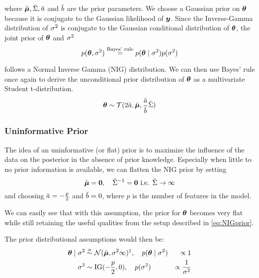 where $\breve{\bm{\mu}}, \breve{\Sigma}, \breve{a}$ and $\breve{b}$ are the prior parameters.
We choose a Gaussian prior on $\bm{\theta}$ because it is conjugate to the Gaussian likelihood of $\bm{y}$.
Since the Inverse-Gamma distribution of $\sigma^2$ is conjugate to the Gaussian conditional distribution of $\bm{\theta}$, the joint prior of $\bm{\theta}$ and $\sigma^2$
\begin{equation*}
    p(\bm{\theta}, \sigma^2) \overset{\text{Bayes' rule}}{=} p(\bm{\theta} \mid \sigma^2) p(\sigma^2)
\end{equation*}

follows a Normal Inverse Gamma (NIG) distribution.
We can then use Bayes' rule once again to derive the unconditional prior distribution of $\bm{\theta}$ as a multivariate Student t-distribution.
\begin{equation*}
    \bm{\theta} \sim \mathcal{T}(2 \breve{a}, \breve{\bm{\mu}}, \frac{\breve{a}}{\breve{b}} \breve{\Sigma})
\end{equation*}

\subsubsection*{Uninformative Prior}
The idea of an uninformative (or flat) prior is to maximize the influence of the data on the posterior in the absence of prior knowledge.
Especially when little to no prior information is available, we can flatten the NIG prior by setting
\begin{equation*}
    \breve{\bm{\mu}} = \bm{0}, \quad \breve{\Sigma}^{-1} = \bm{0} \text{  i.e. } \breve{\Sigma} \to \infty 
\end{equation*}
and choosing $\breve{a} = - \frac{p}{2}$ and $\breve{b} = 0$, where $p$ is the number of features in the model.

We can easily see that with this assumption, the prior for $\bm{\theta}$ becomes very flat while still retaining the useful qualities from the setup described in \eqref{eq:NIGprior}.

The prior distributional assumptions would then be:
\begin{equation} \label{eq:flat-prior}
    \begin{aligned}
        \btheta \mid \ssd &\overset{a}{\sim}  \Ncal(\mupri, \ssd \infty)\footnotemark, \quad p(\btheta\mid \ssd) &\propto 1\\
        \ssd &\sim \IG(-\frac{p}{2},  0), \quad p(\ssd) &\propto \frac{1}{\ssd}
    \end{aligned}
\end{equation}


